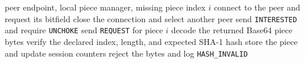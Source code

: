 \begin{algorithm}[H]
  \caption{Validated piece request cycle}
  \label{alg:piece-cycle}
  \begin{algorithmic}[1]
    \Require peer endpoint, local piece manager, missing piece index $i$
    \State connect to the peer and request its bitfield
      \State close the connection and select another peer
    \EndIf
    \State send \texttt{INTERESTED} and require \texttt{UNCHOKE}
    \State send \texttt{REQUEST} for piece $i$
    \State decode the returned Base64 piece bytes
    \State verify the declared index, length, and expected SHA-1 hash
      \State store the piece and update session counters
    \Else
      \State reject the bytes and log \texttt{HASH\_INVALID}
    \EndIf
  \end{algorithmic}
\end{algorithm}
